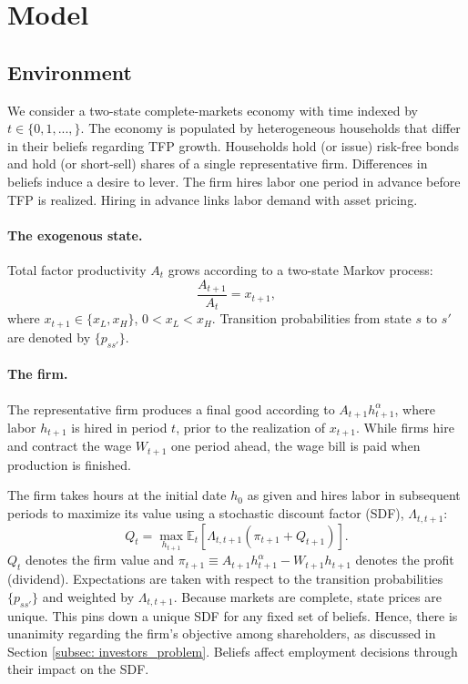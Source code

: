 \section{Model}\label{sec:environment.sec}


\subsection{Environment}

 We consider a two-state complete-markets economy with time indexed by $t\in\{0,1,...,\}$. The economy is populated by heterogeneous households that differ in their beliefs regarding TFP growth. Households hold (or issue) risk-free bonds and hold (or short-sell) shares of a single representative firm. Differences in beliefs induce a desire to lever. 
The firm hires labor one period in advance before TFP is realized. Hiring in advance links labor demand with asset pricing.

\paragraph{The exogenous state.}
Total factor productivity $A_{t}$ grows according to a two-state Markov process:
\begin{equation}
    \frac{A_{t+1}}{A_t} = x_{t+1},
\end{equation}
where $x_{t+1} \in \{x_L, x_H\}$, $0<x_L <x_H $. Transition probabilities from state $s$ to $s'$ are denoted by $\{p_{ss'}\}$. 

\paragraph{The firm.}
The representative firm produces a final good according to $A_{t+1} h_{t+1}^\alpha$, where labor $h_{t+1}$ is hired in period $t$, prior to the realization of $x_{t+1}$. While firms hire and contract the wage $W_{t+1}$ one period ahead, the wage bill is paid when production is finished.

The firm takes hours at the initial date $h_0$ as given and hires labor in subsequent periods to maximize its value using a stochastic discount factor (SDF), $\Lambda_{t,t+1}$: 
\begin{equation} \label{eq: firm_value}
    Q_t =\max_{h_{t+1}}  \mathbb{E}_t\left[ \Lambda_{t,t+1} \left(\pi_{t+1} + Q_{t+1} \right)\right].
\end{equation}
$Q_t$ denotes the firm value and $\pi_{t+1} \equiv A_{t+1} h_{t+1}^\alpha -W_{t+1} h_{t+1}$ denotes the profit (dividend). Expectations are taken with respect to the transition probabilities $\{p_{ss'}\}$ and weighted by $\Lambda_{t,t+1}$. Because markets are complete, state prices are unique. This pins down a unique SDF for any fixed set of beliefs. Hence, there is unanimity regarding the firm's objective among shareholders, as discussed in  Section \ref{subsec: investors_problem}. Beliefs affect employment decisions through their impact on the SDF.

